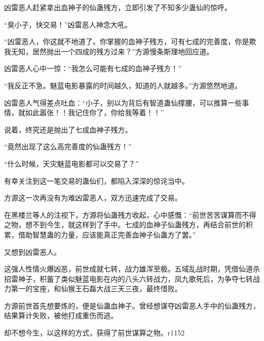 \begin{this_body}
凶雷恶人赶紧拿出血神子的仙蛊残方，立即引发了不知多少蛊仙的惊呼。

“臭小子，快交易！”凶雷恶人神念大吼。

“凶雷恶人，你这就不地道了。你掌握的血神子残方，可有七成的完善度，你是欺我无知，居然抛出一个四成的残方过来？”方源慢条斯理地回应道。

凶雷恶人心中一惊：“我怎么可能有七成的血神子残方！”

“我反正不急。魅蓝电影暴露的时间越久，知道的人就越多。”方源悠然地道。

凶雷恶人气得差点吐血：“小子，别以为背后有智道蛊仙撑腰，可以推算一些事情，就如此嚣张！！我记住你了，你给我等着！！”

说着，终究还是抛出了七成血神子残方。

“竟然出现了这么高完善度的仙蛊残方！”

“什么时候，天灾魅蓝电影都可以交易了？”

有幸关注到这一笔交易的蛊仙们，都陷入深深的惊诧当中。

方源这一次再没有为难凶雷恶人，双方迅速完成了交易。

在黑楼兰等人的注视下，方源将仙蛊残方收起，心中感慨：“前世苦苦谋算而不得之物，想不到今生，就这样到了手中。七成的血神子仙蛊残方，再结合前世的积累，借助智慧蛊的力量，应该能真正完善血神子仙蛊方了罢。”

又想到凶雷恶人。

这强人性情火爆凶恶，前世成就七转，战力雄浑至极。五域乱战时期，凭借仙道杀招雷神子，积蓄了类似魅蓝电影在内的八头六转战力，凤九歌死后，为争夺七转战力第一的宝座，和仙猴王石磊大战三天三夜，最终惜败。

方源前世首先想要炼的，便是仙蛊血神子。曾经想谋夺凶雷恶人手中的仙蛊残方，结果算计失败，被他打成重伤而逃。

却不想今生，以这样的方式，获得了前世谋算之物。r1152

\end{this_body}


